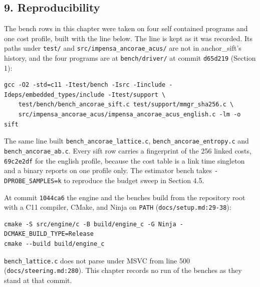 \subsection{9. Reproducibility}

The bench rows in this chapter were taken on four self contained programs and one cost profile, built with the line below. The line is kept as it was recorded. Its paths under \texttt{test/\allowbreak{}} and \texttt{src/\allowbreak{}impensa\_\allowbreak{}ancorae\_\allowbreak{}acus/\allowbreak{}} are not in anchor\_sift's history, and the four programs are at \texttt{bench/\allowbreak{}driver/\allowbreak{}} at commit \texttt{d65d219} (Section 1):

\begin{lstlisting}[breaklines=true,breakatwhitespace=false,basicstyle=\ttfamily\small]
gcc -O2 -std=c11 -Itest/bench -Isrc -Iinclude -Ideps/embedded_types/include -Itest/support \
    test/bench/bench_ancorae_sift.c test/support/mmgr_sha256.c \
    src/impensa_ancorae_acus/impensa_ancorae_acus_english.c -lm -o sift
\end{lstlisting}

The same line built \texttt{bench\_\allowbreak{}ancorae\_\allowbreak{}lattice.\allowbreak{}c}, \texttt{bench\_\allowbreak{}ancorae\_\allowbreak{}entropy.\allowbreak{}c} and \texttt{bench\_\allowbreak{}ancorae\_\allowbreak{}ab.\allowbreak{}c}. Every sift row carries a fingerprint of the 256 linked costs, \texttt{69c2e2df} for the english profile, because the cost table is a link time singleton and a binary reports on one profile only. The estimator bench takes \texttt{-\allowbreak{}DPROBE\_\allowbreak{}SAMPLES=k} to reproduce the budget sweep in Section 4.5.

At commit \texttt{1044ca6} the engine and the benches build from the repository root with a C11 compiler, CMake, and Ninja on \texttt{PATH} (\texttt{docs/\allowbreak{}setup.md:29-\allowbreak{}38}):

\begin{lstlisting}[breaklines=true,breakatwhitespace=false,basicstyle=\ttfamily\small]
cmake -S src/engine/c -B build/engine_c -G Ninja -DCMAKE_BUILD_TYPE=Release
cmake --build build/engine_c
\end{lstlisting}

\texttt{bench\_\allowbreak{}lattice.\allowbreak{}c} does not parse under MSVC from line 500 (\texttt{docs/\allowbreak{}steering.md:280}). This chapter records no run of the benches as they stand at that commit.

